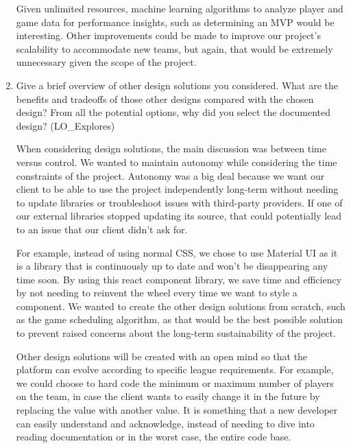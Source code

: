 \documentclass[12pt, titlepage]{article}
\begin{document}
\begin{enumerate}
  Given unlimited resources, machine learning algorithms to analyze player and game data for performance insights, such as determining an MVP would be interesting. Other improvements could be made to improve our project’s scalability to accommodate new teams, but again, that would be extremely unnecessary given the scope of the project.

  \item Give a brief overview of other design solutions you considered.  What
        are the benefits and tradeoffs of those other designs compared with the chosen
        design?  From all the potential options, why did you select the documented design?
        (LO\_Explores)

  When considering design solutions, the main discussion was between time versus control. We wanted to maintain autonomy while considering the time constraints of the project. Autonomy was a big deal because we want our client to be able to use the project independently long-term without needing to update libraries or troubleshoot issues with third-party providers. If one of our external libraries stopped updating its source, that could potentially lead to an issue that our client didn’t ask for. 

  For example, instead of using normal CSS, we chose to use Material UI as it is a library that is continuously up to date and won’t be disappearing any time soon. By using this react component library, we save time and efficiency by not needing to reinvent the wheel every time we want to style a component. We wanted to create the other design solutions from scratch, such as the game scheduling algorithm, as that would be the best possible solution to prevent raised concerns about the long-term sustainability of the project. 
  
  Other design solutions will be created with an open mind so that the platform can evolve according to specific league requirements. For example, we could choose to hard code the minimum or maximum number of players on the team, in case the client wants to easily change it in the future by replacing the value with another value. It is something that a new developer can easily understand and acknowledge, instead of needing to dive into reading documentation or in the worst case, the entire code base.
\end{enumerate}
\end{document}
